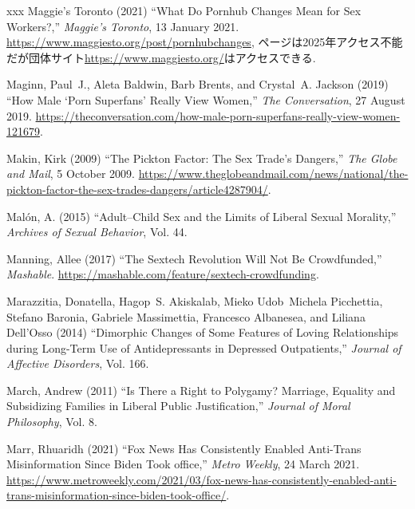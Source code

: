 \documentclass[]{jlreq} \usepackage{mystyle}
\begin{document}
\begin{thebibliography}{xxx}
{Maggie's Toronto} (2021) ``What Do Pornhub Changes Mean for Sex Workers?,''
  \emph{Maggie's Toronto}, 13 January 2021.
  \url{https://www.maggiesto.org/post/pornhubchanges},
  ページは2025年アクセス不能だが団体サイト\url{https://www.maggiesto.org/}はアクセスできる.

Maginn, Paul~J., Aleta Baldwin, Barb Brents, and Crystal~A. Jackson (2019)
  ``How Male `Porn Superfans' Really View Women,'' \emph{The Conversation}, 27
  August 2019.
  \url{https://theconversation.com/how-male-porn-superfans-really-view-women-121679}.

Makin, Kirk (2009) ``The Pickton Factor: The Sex Trade's Dangers,'' \emph{The
  Globe and Mail}, 5 October 2009.
  \url{https://www.theglobeandmail.com/news/national/the-pickton-factor-the-sex-trades-dangers/article4287904/}.

Malón, A. (2015) ``Adult–Child Sex and the Limits of Liberal Sexual
  Morality,'' \textit{ Archives of Sexual Behavior}, Vol. 44.

Manning, Allee (2017) ``The Sextech Revolution Will Not Be Crowdfunded,''
  \emph{Mashable}. \url{https://mashable.com/feature/sextech-crowdfunding}.

Marazzitia, Donatella, Hagop~S. Akiskalab, Mieko Udob~Michela Picchettia,
  Stefano Baronia, Gabriele Massimettia, Francesco Albanesea, and Liliana
  Dell'Osso (2014) ``Dimorphic Changes of Some Features of Loving Relationships
  during Long-Term Use of Antidepressants in Depressed Outpatients,'' \textit{
  Journal of Affective Disorders}, Vol. 166.

March, Andrew (2011) ``Is There a Right to Polygamy? Marriage, Equality and
  Subsidizing Families in Liberal Public Justification,'' \textit{ Journal of
  Moral Philosophy}, Vol. 8.

Marr, Rhuaridh (2021) ``Fox News Has Consistently Enabled Anti-Trans
  Misinformation Since Biden Took office,'' \emph{Metro Weekly}, 24 March 2021.
  \url{https://www.metroweekly.com/2021/03/fox-news-has-consistently-enabled-anti-trans-misinformation-since-biden-took-office/}.


\end{thebibliography}
\end{document}
